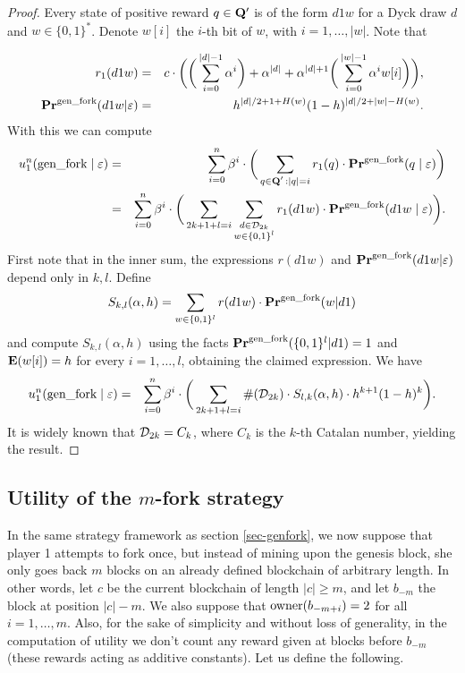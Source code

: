 \begin{proof} Every state of positive reward $q\in\mathbf{Q}'$ is of the form $d1w$ for a Dyck draw $d$ and $w\in \{0,1\}^\ast$. Denote $w[i]$ the $i$-th bit of $w$, with $i=1,\dots,|w|$. Note that

\begin{eqnarray*}
r_1(d1w) &=& c\cdot \bigg(\bigg(\sum_{i=0}^{|d|-1}\alpha^i \bigg)+\alpha^{|d|}+\alpha^{|d|+1}\bigg(\sum_{i=0}^{|w|-1}\alpha^i w[i]\bigg)\bigg),\\
\mathbf{Pr}^{\text{\rm gen\_fork}}(d1w|\varepsilon) &=& h^{|d|/2+1+H(w)}(1-h)^{|d|/2+|w|-H(w)}.
\end{eqnarray*} 
With this we can compute 
\begin{eqnarray*}
	u_1^n(\text{\rm gen\_fork} \mid \varepsilon) & = & \sum_{i=0}^{n}\beta^{i} \cdot  \bigg(\sum_{\substack{q \in \mathbf{Q}' \,: |q| = i}} r_1(q) \cdot 
	\mathbf{Pr}^{\text{\rm gen\_fork}}(q \mid \varepsilon)\bigg)\\
								& = & \sum_{i=0}^{n}\beta^{i} \cdot  \bigg(\sum_{2k+1+l=i}\sum_{\substack{d\in \mathcal{D}_{2k}\\w\in\{0,1\}^l}} r_1(d1w) \cdot 
	\mathbf{Pr}^{\text{\rm gen\_fork}}(d1w \mid \varepsilon)\bigg).
\end{eqnarray*}
First note that in the inner sum, the expressions $r(d1w)$ and $\mathbf{Pr}^{\text{\rm gen\_fork}}(d1w|\varepsilon)$ depend only in $k,l$. Define
$$S_{k,l}(\alpha,h)=\sum_{w\in\{0,1\}^l}r(d1w)\cdot \mathbf{Pr}^{\text{\rm gen\_fork}}(w|d1)$$
and compute $S_{k,l}(\alpha,h)$ using the facts $\mathbf{Pr}^{\text{\rm gen\_fork}}(\{0,1\}^l|d1)=1$ and $\mathbf{E}(w[i])=h$ for every $i=1,\dots,l$, obtaining the claimed expression. We have
\begin{eqnarray*}
u_1^n(\text{\rm gen\_fork} \mid \varepsilon) & = & \sum_{i=0}^{n}\beta^{i} \cdot  \bigg(\sum_{2k+1+l=i} \#(\mathcal{D}_{2k})\cdot S_{l,k}(\alpha,h)\cdot h^{k+1}(1-h)^{k}\bigg).
\end{eqnarray*}
It is widely known that $\mathcal{D}_{2k}=C_k$, where $C_k$ is the $k$-th Catalan number, yielding the result. 
\end{proof}


\subsection{Utility of the $m$-fork strategy}


In the same strategy framework as section \ref{sec-genfork}, we now suppose that player 1 attempts to fork once, but instead of mining upon the genesis block, she only goes back $m$ blocks on an already defined blockchain of arbitrary length. In other words, let $c$ be the current blockchain of length $|c|\geq m$, and let $b_{-m}$ the block at position $|c|-m$. We also suppose that $\text{\rm owner}(b_{-m+i})=2$ for all $i=1,\dots,m$. Also, for the sake of simplicity and without loss of generality, in the computation of utility we don't count any reward given at blocks before $b_{-m}$ (these rewards acting as additive constants). Let us define the following.


